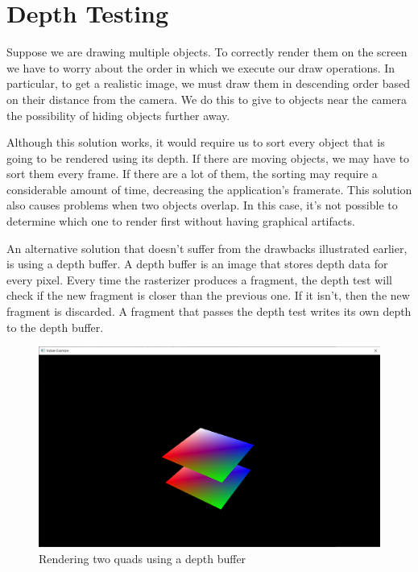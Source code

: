\chapter{Depth Testing}

Suppose we are drawing multiple objects.
To correctly render them on the screen we have to worry about
the order in which we execute our draw operations.
In particular, to get a realistic image, we must draw
them in descending order based on their distance from the camera.
We do this to give to objects near the camera the possibility
of hiding objects further away.

Although this solution works, it would require us to sort
every object that is going to be rendered using its depth.
If there are moving objects, we may have to sort them every frame.
If there are a lot of them, the sorting may require a considerable
amount of time, decreasing the application's framerate.
This solution also causes problems when two objects overlap.
In this case, it's not possible to determine which one
to render first without having graphical artifacts.

An alternative solution that doesn't suffer from the drawbacks
illustrated earlier, is using a depth buffer.
A depth buffer is an image that stores depth data for every pixel.
Every time the rasterizer produces a fragment, the depth test will
check if the new fragment is closer than the previous one.
If it isn't, then the new fragment is discarded.
A fragment that passes the depth test writes its own depth to the
depth buffer.

\begin{figure}[ht]
    \centering
    \includegraphics[scale=0.20]{images/ChDepthTesting/DepthTesting.png}
    \caption{Rendering two quads using a depth buffer}
    \label{fig::DepthTesting}
\end{figure}

